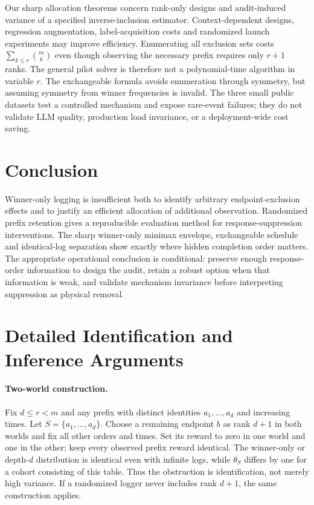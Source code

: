 \documentclass[12pt]{clear2027}
\begin{document}
Our sharp allocation theorems concern rank-only designs and audit-induced variance of a specified inverse-inclusion estimator. Context-dependent designs, regression augmentation, label-acquisition costs and randomized launch experiments may improve efficiency. Enumerating all exclusion sets costs $\sum_{k\le r}\binom{m}{k}$ even though observing the necessary prefix requires only $r+1$ ranks. The general pilot solver is therefore not a polynomial-time algorithm in variable $r$. The exchangeable formula avoids enumeration through symmetry, but assuming symmetry from winner frequencies is invalid. The three small public datasets test a controlled mechanism and expose rare-event failures; they do not validate LLM quality, production load invariance, or a deployment-wide cost saving.

\section{Conclusion}
Winner-only logging is insufficient both to identify arbitrary endpoint-exclusion effects and to justify an efficient allocation of additional observation. Randomized prefix retention gives a reproducible evaluation method for response-suppression interventions. The sharp winner-only minimax envelope, exchangeable schedule and identical-log separation show exactly where hidden completion order matters. The appropriate operational conclusion is conditional: preserve enough response-order information to design the audit, retain a robust option when that information is weak, and validate mechanism invariance before interpreting suppression as physical removal.



\appendix
\section{Detailed Identification and Inference Arguments}\label{app:infer}
\paragraph{Two-world construction.}
Fix $d\le r<m$ and any prefix with distinct identities $a_1,\ldots,a_d$ and increasing times. Let $S=\{a_1,\ldots,a_d\}$. Choose a remaining endpoint $b$ as rank $d+1$ in both worlds and fix all other orders and times. Set its reward to zero in one world and one in the other; keep every observed prefix reward identical. The winner-only or depth-$d$ distribution is identical even with infinite logs, while $\theta_S$ differs by one for a cohort consisting of this table. Thus the obstruction is identification, not merely high variance. If a randomized logger never includes rank $d+1$, the same construction applies.
\end{document}
